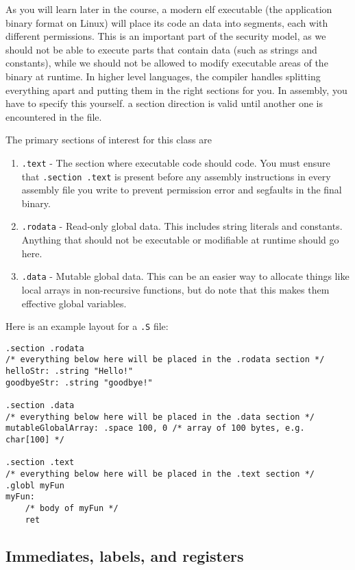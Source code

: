 \documentclass[11pt]{article}
\begin{document}
As you will learn later in the course, a modern elf executable (the application binary
format on Linux) will place its code an data into segments, each with different
permissions. This is an important part of the security model, as we should not be able to
execute parts that contain data (such as strings and constants), while we should not be
allowed to modify executable areas of the binary at runtime. In higher level languages,
the compiler handles splitting everything apart and putting them in the right sections for
you. In assembly, you have to specify this yourself. a section direction is valid until
another one is encountered in the file.

The primary sections of interest for this class are

\begin{enumerate}
    \item \texttt{.text} - The section where executable code should code. You must ensure
        that \texttt{.section .text} is present before any assembly instructions in every
        assembly file you write to prevent permission error and segfaults in the final
        binary.
    \item \texttt{.rodata} - Read-only global data. This includes string literals and constants.
        Anything that should not be executable or modifiable at runtime should go here.
    \item \texttt{.data} - Mutable global data. This can be an easier way to allocate things
        like local arrays in non-recursive functions, but do note that this makes them
        effective global variables.
\end{enumerate}

Here is an example layout for a \texttt{.S} file:

\begin{lstlisting}[caption={.S file section layout}, captionpos=b]
.section .rodata
/* everything below here will be placed in the .rodata section */
helloStr: .string "Hello!"
goodbyeStr: .string "goodbye!"

.section .data
/* everything below here will be placed in the .data section */
mutableGlobalArray: .space 100, 0 /* array of 100 bytes, e.g. char[100] */

.section .text
/* everything below here will be placed in the .text section */
.globl myFun
myFun:
    /* body of myFun */
    ret
\end{lstlisting}

\subsection{Immediates, labels, and registers}
\end{document}
